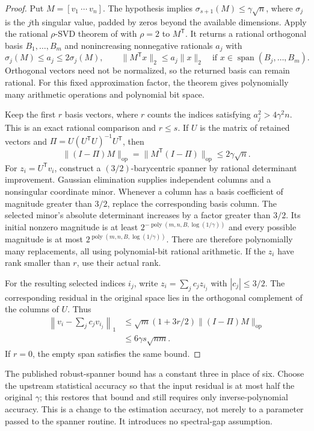 \documentclass[11pt]{article}
\newcommand{\poly}{\operatorname{poly}}
\theoremstyle{definition}
\theoremstyle{remark}
\begin{document}
\begin{proof}
Put $M=[v_1\ \cdots\ v_n]$. The hypothesis implies
$\sigma_{s+1}(M)\le\gamma\sqrt n$, where $\sigma_j$ is the $j$th singular value, padded by zeros beyond the available dimensions. Apply the rational $\rho$-SVD theorem of \citet{rational-svd} with $\rho=2$ to $M^{\mathsf T}$. It returns a rational orthogonal basis $B_1,\ldots,B_m$ and nonincreasing nonnegative rationals $a_j$ with
\[
\sigma_j(M)\le a_j\le2\sigma_j(M),\qquad
\|M^{\mathsf T}x\|_2\le a_j\|x\|_2
\quad\text{if }x\in\operatorname{span}(B_j,\ldots,B_m).
\]
Orthogonal vectors need not be normalized, so the returned basis can remain rational. For this fixed approximation factor, the theorem gives polynomially many arithmetic operations and polynomial bit space.

Keep the first $r$ basis vectors, where $r$ counts the indices satisfying $a_j^2>4\gamma^2n$. This is an exact rational comparison and $r\le s$. If $U$ is the matrix of retained vectors and $\Pi=U(U^{\mathsf T}U)^{-1}U^{\mathsf T}$, then
\[
\|(I-\Pi)M\|_{\mathrm{op}}
=\|M^{\mathsf T}(I-\Pi)\|_{\mathrm{op}}
\le2\gamma\sqrt n.
\]
For $z_i=U^{\mathsf T}v_i$, construct a $(3/2)$-barycentric spanner by rational determinant improvement. Gaussian elimination supplies independent columns and a nonsingular coordinate minor. Whenever a column has a basis coefficient of magnitude greater than $3/2$, replace the corresponding basis column. The selected minor's absolute determinant increases by a factor greater than $3/2$. Its initial nonzero magnitude is at least $2^{-\poly(m,n,B,\log(1/\gamma))}$ and every possible magnitude is at most $2^{\poly(m,n,B,\log(1/\gamma))}$. There are therefore polynomially many replacements, all using polynomial-bit rational arithmetic. If the $z_i$ have rank smaller than $r$, use their actual rank.

For the resulting selected indices $i_j$, write $z_i=\sum_j c_jz_{i_j}$ with $|c_j|\le3/2$. The corresponding residual in the original space lies in the orthogonal complement of the columns of $U$. Thus
\[
\begin{split}
\left\|v_i-\sum_jc_jv_{i_j}\right\|_1
&\le\sqrt m(1+3r/2)\|(I-\Pi)M\|_{\mathrm{op}}\\
&\le6\gamma s\sqrt{nm}.
\end{split}
\]
If $r=0$, the empty span satisfies the same bound.
\end{proof}

The published robust-spanner bound has a constant three in place of six. Choose the upstream statistical accuracy so that the input residual is at most half the original $\gamma$; this restores that bound and still requires only inverse-polynomial accuracy. This is a change to the estimation accuracy, not merely to a parameter passed to the spanner routine. It introduces no spectral-gap assumption.
\end{document}
